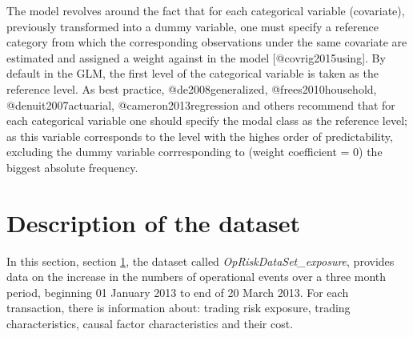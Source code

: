\documentclass[]{article}
\begin{document}
The model revolves around the fact that for each categorical variable
(covariate), previously transformed into a dummy variable, one must
specify a reference category from which the corresponding observations
under the same covariate are estimated and assigned a weight against in
the model {[}@covrig2015using{]}. By default in the GLM, the first level
of the categorical variable is taken as the reference level. As best
practice, @de2008generalized, @frees2010household, @denuit2007actuarial,
@cameron2013regression and others recommend that for each categorical
variable one should specify the modal class as the reference level; as
this variable corresponds to the level with the highes order of
predictability, excluding the dummy variable corrresponding to (weight
coefficient = \(0\)) the biggest absolute frequency.

\section{Description of the dataset}
\label{sec:Description of the dataset}

In this section, section \ref{sec:Description of the dataset}, the
dataset called \emph{OpRiskDataSet\_exposure}, provides data on the
increase in the numbers of operational events over a three month period,
beginning 01 January 2013 to end of 20 March 2013. For each transaction,
there is information about: trading risk exposure, trading
characteristics, causal factor characteristics and their cost.
\end{document}
